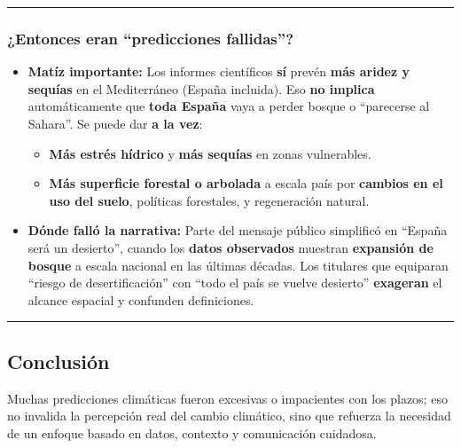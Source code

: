 \documentclass[
  11pt,
  a4paper,
  DIV=11,
  numbers=noendperiod]{scrreprt}
\providecommand{\tightlist}{%
  \setlength{\itemsep}{0pt}\setlength{\parskip}{0pt}}
\begin{document}
\begin{center}\rule{0.5\linewidth}{0.5pt}\end{center}

\subsubsection{¿Entonces eran ``predicciones
fallidas''?}\label{entonces-eran-predicciones-fallidas}

\begin{itemize}
\tightlist
\item
  \textbf{Matíz importante:} Los informes científicos \textbf{sí} prevén
  \textbf{más aridez y sequías} en el Mediterráneo (España incluida).
  Eso \textbf{no implica} automáticamente que \textbf{toda España} vaya
  a perder bosque o ``parecerse al Sahara''. Se puede dar \textbf{a la
  vez}:

  \begin{itemize}
  \tightlist
  \item
    \textbf{Más estrés hídrico} y \textbf{más sequías} en zonas
    vulnerables.\\
  \item
    \textbf{Más superficie forestal o arbolada} a escala país por
    \textbf{cambios en el uso del suelo}, políticas forestales, y
    regeneración natural.
  \end{itemize}
\item
  \textbf{Dónde falló la narrativa:} Parte del mensaje público
  simplificó en ``España será un desierto'', cuando los \textbf{datos
  observados} muestran \textbf{expansión de bosque} a escala nacional en
  las últimas décadas. Los titulares que equiparan ``riesgo de
  desertificación'' con ``todo el país se vuelve desierto''
  \textbf{exageran} el alcance espacial y confunden definiciones.
\end{itemize}

\begin{center}\rule{0.5\linewidth}{0.5pt}\end{center}

\subsection{Conclusión}\label{conclusiuxf3n}

Muchas predicciones climáticas fueron excesivas o impacientes con los
plazos; eso no invalida la percepción real del cambio climático, sino
que refuerza la necesidad de un enfoque basado en datos, contexto y
comunicación cuidadosa.
\end{document}
